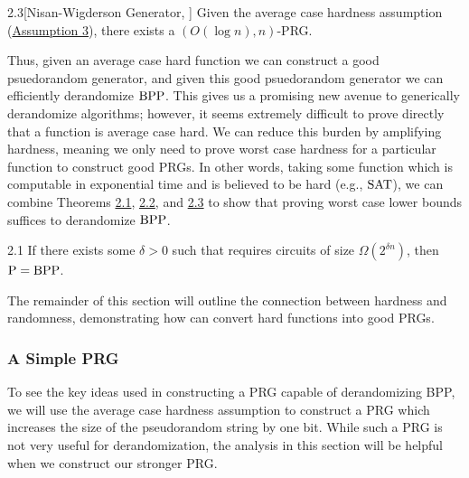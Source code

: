 \documentclass[11pt]{article}
\begin{document}
\begin{theorem}{2.3}[Nisan-Wigderson Generator, \cite{NW94}] \label{t-2-3}
    Given the average case hardness assumption (\hyperref[a-3]{Assumption 3}), there exists a $(O(\log n), n)$-PRG.
\end{theorem}

Thus, given an average case hard function we can construct a good psuedorandom generator, and given this good psuedorandom generator we can efficiently derandomize $\textup{BPP}$. This gives us a promising new avenue to generically derandomize algorithms; however, it seems extremely difficult to prove directly that a function is average case hard. We can reduce this burden by amplifying hardness, meaning we only need to prove worst case hardness for a particular function to construct good PRGs. In other words, taking some function which is computable in exponential time and is believed to be hard (e.g., $\textup{SAT}{}$), we can combine Theorems \hyperref[t-2-1]{2.1}, \hyperref[t-2-2]{2.2}, and \hyperref[t-2-3]{2.3} to show that proving worst case lower bounds suffices to derandomize $\textup{BPP}{}$.

\begin{corollary}{2.1}
    If there exists some $\delta > 0$ such that \SAT{} requires circuits of size $\Omega(2^{\delta n})$, then $\mathrm{P} = \textup{BPP}$.
\end{corollary}

The remainder of this section will outline the connection between hardness and randomness, demonstrating how can convert hard functions into good PRGs.

\subsubsection{A Simple PRG}

To see the key ideas used in constructing a PRG capable of derandomizing BPP, we will use the average case hardness assumption to construct a PRG which increases the size of the pseudorandom string by one bit. While such a PRG is not very useful for derandomization, the analysis in this section will be helpful when we construct our stronger PRG.
\end{document}
